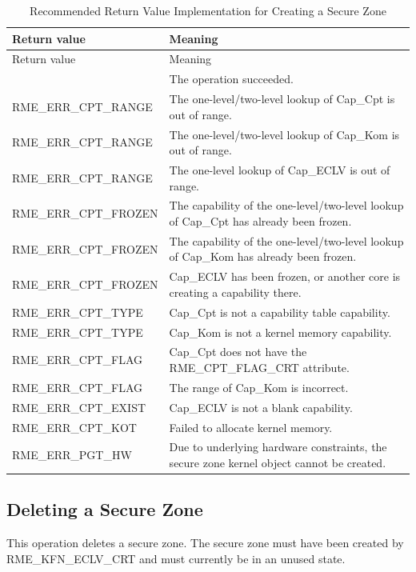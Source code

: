 \begin{xltabular}{\textwidth}{@{}>{\hsize\raggedright\arraybackslash}X>{\hsize\raggedright\arraybackslash}X@{}}
\caption{Recommended Return Value Implementation for Creating a Secure Zone}\label{tab:8-95-create-enclave-suggested-return-values}\\
\toprule
Return value & Meaning\tabularnewline
\endfirsthead
\toprule
Return value & Meaning\tabularnewline
\midrule
\endhead
\bottomrule
{} & The operation succeeded.\tabularnewline
    RME\_ERR\_CPT\_RANGE & The one-level/two-level lookup of Cap\_Cpt is out of range.\tabularnewline
    RME\_ERR\_CPT\_RANGE & The one-level/two-level lookup of Cap\_Kom is out of range.\tabularnewline
    RME\_ERR\_CPT\_RANGE & The one-level lookup of Cap\_ECLV is out of range.\tabularnewline
    RME\_ERR\_CPT\_FROZEN & The capability of the one-level/two-level lookup of Cap\_Cpt has already been frozen.\tabularnewline
    RME\_ERR\_CPT\_FROZEN & The capability of the one-level/two-level lookup of Cap\_Kom has already been frozen.\tabularnewline
    RME\_ERR\_CPT\_FROZEN & Cap\_ECLV has been frozen, or another core is creating a capability there.\tabularnewline
    RME\_ERR\_CPT\_TYPE & Cap\_Cpt is not a capability table capability.\tabularnewline
    RME\_ERR\_CPT\_TYPE & Cap\_Kom is not a kernel memory capability.\tabularnewline
    RME\_ERR\_CPT\_FLAG & Cap\_Cpt does not have the RME\_CPT\_FLAG\_CRT attribute.\tabularnewline
    RME\_ERR\_CPT\_FLAG & The range of Cap\_Kom is incorrect.\tabularnewline
    RME\_ERR\_CPT\_EXIST & Cap\_ECLV is not a blank capability.\tabularnewline
    RME\_ERR\_CPT\_KOT & Failed to allocate kernel memory.\tabularnewline
    RME\_ERR\_PGT\_HW & Due to underlying hardware constraints, the secure zone kernel object cannot be created.\tabularnewline
\end{xltabular}
\nopagebreak[4]

\subsection{Deleting a Secure Zone}\label{subsec:8-delete-enclave}

This operation deletes a secure zone. The secure zone must have been created by RME\_KFN\_ECLV\_CRT and must currently be in an unused state.

